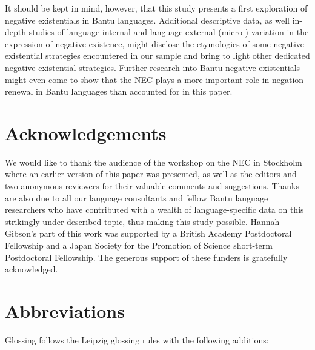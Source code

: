 \documentclass[output=paper]{langscibook}
\begin{document}
It should be kept in mind, however, that this study presents a first exploration of negative existentials in Bantu languages. Additional descriptive data, as well in-depth studies of language-internal and language external (micro-) variation in the expression of negative existence, might disclose the etymologies of some negative existential strategies encountered
in our sample and bring to light other dedicated negative existential strategies. Further research into Bantu negative existentials might even come to show that the NEC plays a more important role in negation renewal in Bantu languages than accounted for in this paper.

\section*{Acknowledgements}

We would like to thank the audience of the workshop on the NEC in Stockholm
where an earlier version of this paper was presented, as well as the
editors and two anonymous reviewers for their valuable comments and
suggestions. Thanks are also due to all our language consultants and fellow
Bantu language researchers who have contributed with a wealth of
language-specific data on this strikingly under-described topic, thus
making this study possible. Hannah Gibson's part of this work was supported
by a British Academy Postdoctoral Fellowship and a Japan Society for the
Promotion of Science short-term Postdoctoral Fellowship. The generous
support of these funders is gratefully acknowledged.

\section*{Abbreviations}
Glossing follows the Leipzig glossing rules with the following
additions:\\\nopagebreak
\end{document}
